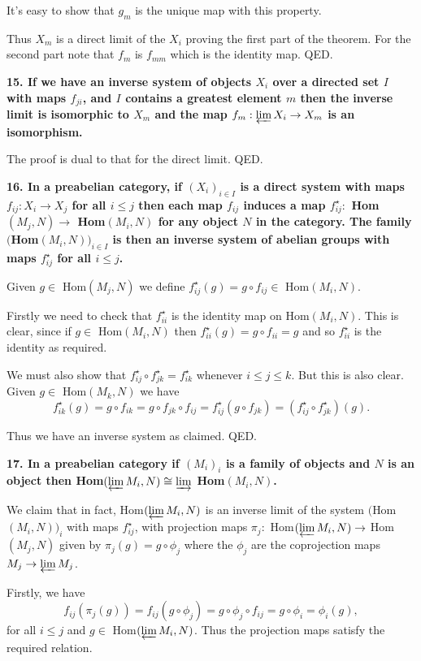 \documentclass[12pt]{article}
\begin{document}
It's easy to show that $g_m$ is the unique map with this property.

Thus $X_m$ is a direct limit of the $X_i$ proving the first part of the theorem. For the second part note that $f_m$ is $f_{mm}$ which is the identity map. QED.

\textbf{15. If we have an inverse system of objects $X_i$ over a directed set $I$ with maps $f_{ji}$, and $I$ contains a greatest element $m$ then the inverse limit is isomorphic to $X_m$ and the map $f_m : \varprojlim X_i \to X_m$ is an isomorphism.}

The proof is dual to that for the direct limit. QED.

\textbf{16. In a preabelian category, if $(X_i)_{i\in I}$ is a direct system with maps $f_{ij} : X_i \to X_j$ for all $i \leq j$ then each map $f_{ij}$ induces a map $f^\star_{ij} :$ Hom$(M_j, N) \to$ Hom$(M_i, N)$ for any object $N$ in the category. The family $($Hom$(M_i, N))_{i\in I}$ is then an inverse system of abelian groups with maps $f^\star_{ij}$ for all $i \leq j$.}

Given $g \in$ Hom$(M_j, N)$ we define $f^\star_{ij}(g) = g\circ f_{ij} \in$ Hom$(M_i, N)$.

Firstly we need to check that $f^\star_{ii}$ is the identity map on Hom$(M_i, N)$. This is clear, since if $g \in$ Hom$(M_i, N)$ then $f^\star_{ii}(g) = g\circ f_{ii} = g$ and so $f^\star_{ii}$ is the identity as required.

We must also show that $f^\star_{ij}\circ f^\star_{jk} = f^\star_{ik}$ whenever $i \leq j \leq k$. But this is also clear. Given $g \in$ Hom$(M_k, N)$ we have
$$f^\star_{ik}(g) = g\circ f_{ik} = g\circ f_{jk}\circ f_{ij} = f^\star_{ij}(g\circ f_{jk}) = (f^\star_{ij}\circ f^\star_{jk})(g).$$

Thus we have an inverse system as claimed. QED.

\textbf{17. In a preabelian category if $(M_i)_i$ is a family of objects and $N$ is an object then Hom$(\varprojlim M_i, N) \cong \varinjlim$ Hom$(M_i, N)$.}

We claim that in fact, Hom$(\varprojlim M_i, N)$ is an inverse limit of the system $($Hom$(M_i, N))_i$ with maps $f^\star_{ij}$, with projection maps $\pi_j :$ Hom$(\varprojlim M_i, N) \to$ Hom$(M_j, N)$ given by $\pi_j(g) = g\circ \phi_j$ where the $\phi_j$ are the coprojection maps $M_j \to \varprojlim M_j$.

Firstly, we have
$$f_{ij}(\pi_j(g)) = f_{ij}(g\circ \phi_j) = g\circ \phi_j\circ f_{ij} = g\circ \phi_i = \phi_i(g),$$
for all $i \leq j$ and $g \in$ Hom$(\varprojlim M_i, N)$. Thus the projection maps satisfy the required relation.
\end{document}
